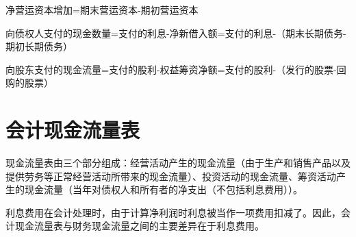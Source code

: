 \documentclass{article}
\begin{document}
净营运资本增加=期末营运资本-期初营运资本

\hspace*{\fill}

向债权人支付的现金数量=支付的利息-净新借入额=支付的利息-（期末长期债务-期初长期债务）

向股东支付的现金流量=支付的股利-权益筹资净额=支付的股利-（发行的股票-回购的股票）

\section{会计现金流量表}
现金流量表由三个部分组成：经营活动产生的现金流量（由于生产和销售产品以及提供劳务等正常经营活动所带来的现金流量）、投资活动的现金流量、筹资活动产生的现金流量（当年对债权人和所有者的净支出（不包括利息费用））。

\hspace*{\fill}

利息费用在会计处理时，由于计算净利润时利息被当作一项费用扣减了。因此，会计现金流量表与财务现金流量之间的主要差异在于利息费用。
\end{document}
